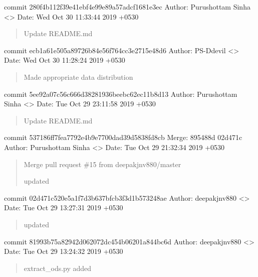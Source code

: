 \documentclass[letterpaper,10pt,english]{sphinxmanual}
\begin{document}
commit 280f4b112f39e41ebf4e99e89a57adcf1681e3ec
Author: Purushottam Sinha \textless{}\textgreater{}
Date:   Wed Oct 30 11:33:44 2019 +0530
\begin{quote}

Update README.md
\end{quote}

commit ecb1a61e505a89726b84e56f764cc3e2715e48d6
Author: PS-Ddevil \textless{}\textgreater{}
Date:   Wed Oct 30 11:28:24 2019 +0530
\begin{quote}

Made appropriate data distribution
\end{quote}

commit 5ee92a07c56c666d38281936beebc62ec11b8d13
Author: Purushottam Sinha \textless{}\textgreater{}
Date:   Tue Oct 29 23:11:58 2019 +0530
\begin{quote}

Update README.md
\end{quote}

commit 537186ff7fea7792e4b9e7700dad39d5838fd8cb
Merge: 895488d 02d471c
Author: Purushottam Sinha \textless{}\textgreater{}
Date:   Tue Oct 29 21:32:34 2019 +0530
\begin{quote}

Merge pull request \#15 from deepakjnv880/master

updated
\end{quote}

commit 02d471c520e5a1f7d3b637bfcb3f3d1b573248ae
Author: deepakjnv880 \textless{}\textgreater{}
Date:   Tue Oct 29 13:27:31 2019 +0530
\begin{quote}

updated
\end{quote}

commit 81993b75a82942d062072dc454b06201a844bc6d
Author: deepakjnv880 \textless{}\textgreater{}
Date:   Tue Oct 29 13:24:32 2019 +0530
\begin{quote}

extract\_ods.py added
\end{quote}
\end{document}
